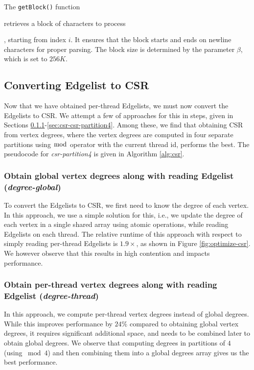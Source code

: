 The \texttt{getBlock()} function retrieves a block of characters to process, starting from index $i$. It ensures that the block starts and ends on newline characters for proper parsing. The block size is determined by the parameter $\beta$, which is set to $256K$.




\subsection{Converting Edgelist to CSR}

Now that we have obtained per-thread Edgelists, we must now convert the Edgelists to CSR. We attempt a few of approaches for this in steps, given in Sections \ref{sec:csr-degree-global}-\ref{sec:csr-csr-partition4}. Among these, we find that obtaining CSR from vertex degrees, where the vertex degrees are computed in four separate partitions using $\bmod$ operator with the current thread id, performs the best. The pseudocode for \textit{csr-partition4} is given in Algorithm \ref{alg:csr}.


\subsubsection{Obtain global vertex degrees along with reading Edgelist (\textit{degree-global})}
\label{sec:csr-degree-global}

To convert the Edgelists to CSR, we first need to know the degree of each vertex. In this approach, we use a simple solution for this, i.e.,  we update the degree of each vertex in a single shared array using atomic operations, while reading Edgelists on each thread. The relative runtime of this approach with respect to simply reading per-thread Edgelists is $1.9\times$, as shown in Figure \ref{fig:optimize-csr}. We however observe that this results in high contention and impacts performance.




\subsubsection{Obtain per-thread vertex degrees along with reading Edgelist (\textit{degree-thread})}
\label{sec:csr-degree-thread}

In this approach, we compute per-thread vertex degrees instead of global degrees. While this improves performance by $24\%$ compared to obtaining global vertex degrees, it requires significant additional space, and needs to be combined later to obtain global degrees. We observe that computing degrees in partitions of $4$ (using $\bmod 4$) and then combining them into a global degrees array gives us the best performance.


